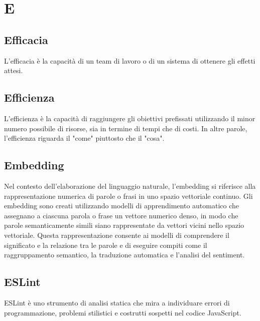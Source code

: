 \section{E}

\vspace{2em}
\subsection*{Efficacia}
\par L'efficacia è la capacità di un team di lavoro o di un sistema di ottenere gli effetti attesi.

\vspace{2em}
\subsection*{Efficienza}
\par L'efficienza è la capacità di raggiungere gli obiettivi prefissati utilizzando il minor numero possibile di risorse, sia in termine di tempi che di costi. In altre parole, l'efficienza riguarda il "come" piuttosto che il "cosa".

\vspace{2em}
\subsection*{Embedding}
\par Nel contesto dell'elaborazione del linguaggio naturale, l'embedding si riferisce alla rappresentazione numerica di parole o frasi in uno spazio vettoriale continuo. Gli embedding sono creati utilizzando modelli di apprendimento automatico che assegnano a ciascuna parola o frase un vettore numerico denso, in modo che parole semanticamente simili siano rappresentate da vettori vicini nello spazio vettoriale. Questa rappresentazione consente ai modelli di comprendere il significato e la relazione tra le parole e di eseguire compiti come il raggruppamento semantico, la traduzione automatica e l'analisi del sentiment.

\vspace{2em}
\subsection*{ESLint}
\par ESLint è uno strumento di analisi statica che mira a individuare errori di programmazione, problemi stilistici e costrutti sospetti nel codice JavaScript.
